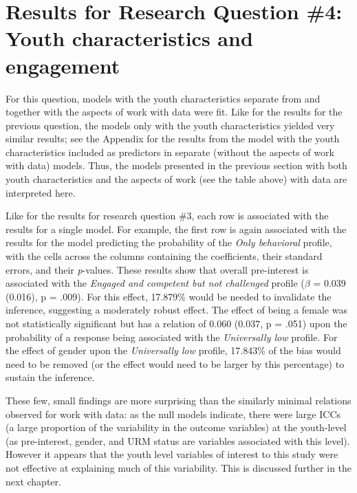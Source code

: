 \documentclass[]{msu-thesis}
\theoremstyle{definition}
\theoremstyle{definition}
\theoremstyle{definition}
\theoremstyle{remark}
\begin{document}
\section{Results for Research Question \#4: Youth characteristics and
engagement}\label{results-for-research-question-4-youth-characteristics-and-engagement}

For this question, models with the youth characteristics separate from
and together with the aspects of work with data were fit. Like for the
results for the previous question, the models only with the youth
characteristics yielded very similar results; see the Appendix for the
results from the model with the youth characteristics included as
predictors in separate (without the aspects of work with data) models.
Thus, the models presented in the previous section with both youth
characteristics and the aspects of work (see the table above) with data
are interpreted here.

Like for the results for research question \#3, each row is associated
with the results for a single model. For example, the first row is again
associated with the results for the model predicting the probability of
the \emph{Only behavioral} profile, with the cells across the columns
containing the coefficients, their standard errors, and their
\emph{p}-values. These results show that overall pre-interest is
associated with the \emph{Engaged and competent but not challenged}
profile (\(\beta\) = 0.039 (0.016), p = .009). For this effect, 17.879\%
would be needed to invalidate the inference, suggesting a moderately
robust effect. The effect of being a female was not statistically
significant but has a relation of 0.060 (0.037, p = .051) upon the
probability of a response being associated with the \emph{Universally
low} profile. For the effect of gender upon the \emph{Universally low}
profile, 17.843\% of the bias would need to be removed (or the effect
would need to be larger by this percentage) to sustain the inference.

These few, small findings are more surprising than the similarly minimal
relations observed for work with data: as the null models indicate,
there were large ICCs (a large proportion of the variability in the
outcome variables) at the youth-level (as pre-interest, gender, and URM
status are variables associated with this level). However it appears
that the youth level variables of interest to this study were not
effective at explaining much of this variability. This is discussed
further in the next chapter.
\end{document}
